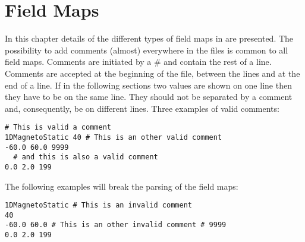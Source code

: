 \chapter{\opalt Field Maps}
\label{chp:app_fieldmaps}
In this chapter details of the different types of field maps in \opalt are presented. The possibility to add comments (almost) everywhere in the files is common to all field maps. Comments are initiated by a \# and contain the rest of a line. Comments are accepted at the beginning of the file, between the lines and at the end of a line. If in the following sections two values are shown on one line then they have to be on the same line. They should not be separated by a comment and, consequently, be on different lines. Three examples of valid comments:
\begin{fmpage}
\begin{verbatim}
# This is valid a comment
1DMagnetoStatic 40 # This is an other valid comment
-60.0 60.0 9999
  # and this is also a valid comment
0.0 2.0 199
\end{verbatim}
\end{fmpage}

The following examples will break the parsing of the field maps:
\begin{fmpage}
\begin{verbatim}
1DMagnetoStatic # This is an invalid comment
40
-60.0 60.0 # This is an other invalid comment # 9999
0.0 2.0 199
\end{verbatim}
\end{fmpage}

